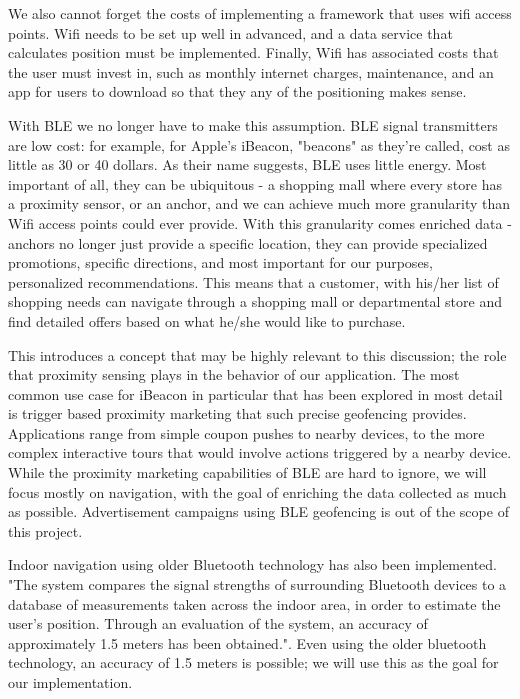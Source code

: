 \documentclass{sig-alternate}
\begin{document}
We also cannot forget the costs of implementing a framework that
uses wifi access points. Wifi needs to be set up well in advanced,
and a data service that calculates position must be implemented.
Finally, Wifi has associated costs that the user must invest in, such
as monthly internet charges, maintenance, and an app for users
to download so that they any of the positioning makes sense.

With BLE we no longer have to make this assumption. BLE signal 
transmitters are low cost: for example, for Apple's iBeacon, "beacons"
as they're called, cost as little as 30 or 40 dollars.  As their name
suggests, BLE uses little energy. Most important of all, they can be
ubiquitous - a shopping mall where every store has a proximity
sensor, or an anchor, and we can achieve much more granularity
than Wifi access points could ever provide. With this granularity 
comes enriched data - anchors no longer just provide a specific 
location, they can provide specialized promotions, specific 
directions, and most important for our purposes, personalized 
recommendations.\cite{gottipati} This means that a customer, with 
his/her list of shopping needs can navigate through a shopping mall 
or departmental store and find detailed offers based on what 
he/she would like to purchase.

This introduces a concept that may be highly relevant to this discussion;
the role that proximity sensing plays in the behavior of our
application. The most common use case for iBeacon in particular that 
has been explored in most detail is trigger based proximity marketing
that such precise geofencing provides. Applications range from simple
coupon pushes to nearby devices, to the more complex interactive 
tours that would involve actions triggered by a nearby device. 
While the proximity marketing capabilities of BLE are hard to ignore,
we will focus mostly on navigation, with the goal of enriching the 
data collected as much as possible. Advertisement campaigns using
BLE geofencing is out of the scope of this project.

Indoor navigation using older Bluetooth technology has also been
implemented. "The system compares the signal strengths of
surrounding Bluetooth devices to a database of measurements
taken across the indoor area, in order to estimate the user's
position. Through an evaluation of the system, an accuracy of
approximately 1.5 meters has been obtained."\cite{bekkelien}.
Even using the older bluetooth technology, an accuracy of 1.5
meters is possible; we will use this as the goal for our 
implementation.
\end{document}
